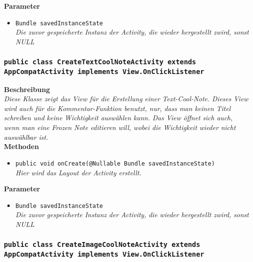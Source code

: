                 \textbf{Parameter}
                \begin{itemize}
        		\item\texttt{Bundle savedInstanceState}\\ 
                \textit{Die zuvor gespeicherte Instanz der Activity, die wieder hergestellt zwird, sonst NULL}\\
                \end{itemize} 
                
        \subsubsection{\texttt{public class CreateTextCoolNoteActivity extends AppCompatActivity implements View.OnClickListener}}
               
               	\textbf{Beschreibung} \\
      	        \textit{Diese Klasse zeigt das View für die Erstellung einer Text-Cool-Note. Dieses View wird auch für die Kommentar-Funktion benutzt, nur, dass man keinen Titel schreiben und keine Wichtigkeit auswählen kann. Das View öffnet sich auch, wenn man eine Frozen Note editieren will, wobei die Wichtigkeit wieder nicht auswählbar ist.} \\
                
                \textbf{Methoden}
                \begin{itemize}
        		\item\texttt{{public void onCreate(@Nullable Bundle savedInstanceState)}}\\
                \textit{Hier wird das Layout der Activity erstellt.}\\
                \end{itemize}
                
                \textbf{Parameter}
                \begin{itemize}
        		\item\texttt{Bundle savedInstanceState}\\  
                \textit{Die zuvor gespeicherte Instanz der Activity, die wieder hergestellt zwird, sonst NULL}\\
                \end{itemize} 
          
         
     	\subsubsection{\texttt{public class CreateImageCoolNoteActivity extends AppCompatActivity implements View.OnClickListener}}
               
